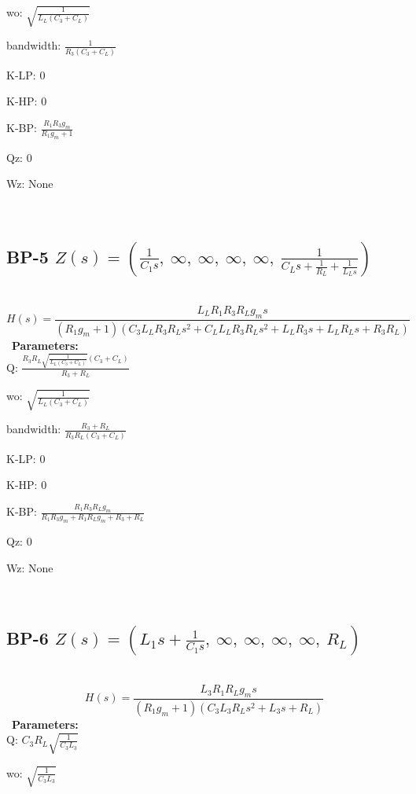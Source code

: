 \documentclass{article}
\begin{document}
wo: $\sqrt{\frac{1}{L_{L} \left(C_{3} + C_{L}\right)}}$\ 

bandwidth: $\frac{1}{R_{3} \left(C_{3} + C_{L}\right)}$\ 

K-LP: $0$\ 

K-HP: $0$\ 

K-BP: $\frac{R_{1} R_{3} g_{m}}{R_{1} g_{m} + 1}$\ 

Qz: $0$\ 

Wz: $\text{None}$\ 

\ 

\subsection{BP-5 $Z(s) = \left( \frac{1}{C_{1} s}, \  \infty, \  \infty, \  \infty, \  \infty, \  \frac{1}{C_{L} s + \frac{1}{R_{L}} + \frac{1}{L_{L} s}}\right)$ } \ 
\textbf{\[H(s) = \frac{L_{L} R_{1} R_{3} R_{L} g_{m} s}{\left(R_{1} g_{m} + 1\right) \left(C_{3} L_{L} R_{3} R_{L} s^{2} + C_{L} L_{L} R_{3} R_{L} s^{2} + L_{L} R_{3} s + L_{L} R_{L} s + R_{3} R_{L}\right)}\] } \ 
\textbf{Parameters:}\\ 

Q: $\frac{R_{3} R_{L} \sqrt{\frac{1}{L_{L} \left(C_{3} + C_{L}\right)}} \left(C_{3} + C_{L}\right)}{R_{3} + R_{L}}$\ 

wo: $\sqrt{\frac{1}{L_{L} \left(C_{3} + C_{L}\right)}}$\ 

bandwidth: $\frac{R_{3} + R_{L}}{R_{3} R_{L} \left(C_{3} + C_{L}\right)}$\ 

K-LP: $0$\ 

K-HP: $0$\ 

K-BP: $\frac{R_{1} R_{3} R_{L} g_{m}}{R_{1} R_{3} g_{m} + R_{1} R_{L} g_{m} + R_{3} + R_{L}}$\ 

Qz: $0$\ 

Wz: $\text{None}$\ 

\ 

\subsection{BP-6 $Z(s) = \left( L_{1} s + \frac{1}{C_{1} s}, \  \infty, \  \infty, \  \infty, \  \infty, \  R_{L}\right)$ } \ 
\textbf{\[H(s) = \frac{L_{3} R_{1} R_{L} g_{m} s}{\left(R_{1} g_{m} + 1\right) \left(C_{3} L_{3} R_{L} s^{2} + L_{3} s + R_{L}\right)}\] } \ 
\textbf{Parameters:}\\ 

Q: $C_{3} R_{L} \sqrt{\frac{1}{C_{3} L_{3}}}$\ 

wo: $\sqrt{\frac{1}{C_{3} L_{3}}}$\ 
\end{document}
